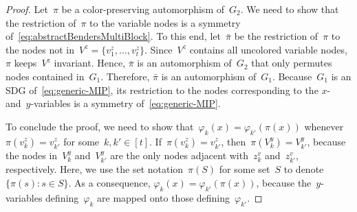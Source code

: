 \documentclass[a4paper,10pt]{article}
\theoremstyle{definition}
\begin{document}
\begin{proof}
  Let~$\pi$ be a color-preserving automorphism of~$G_2$.
  We need to show that the restriction of~$\pi$ to the variable nodes is a symmetry of~\eqref{eq:abstractBendersMultiBlock}.
  To this end, let~$\bar{\pi}$ be the restriction of~$\pi$ to the nodes not in~$V^z = \{v^z_1,\dots,v^z_t\}$.
  Since~$V^z$ contains all uncolored variable nodes, $\pi$ keeps~$V^z$ invariant.
  Hence, $\bar{\pi}$ is an automorphism of~$G_2$ that only permutes nodes contained in~$G_1$.
  Therefore, $\bar{\pi}$ is an automorphism of~$G_1$.
  Because~$G_1$ is an SDG of~\eqref{eq:generic-MIP}, its restriction to the nodes corresponding to the $x$- and~$y$-variables is a symmetry of~\eqref{eq:generic-MIP}.

  To conclude the proof, we need to show that~$\varphi_k(x) = \varphi_{k'}(\pi(x))$ whenever~$\pi(v^z_k) = v^z_{k'}$ for some~$k,k' \in [t]$.
  If~$\pi(v^z_k) = v^z_{k'}$, then~$\pi(V^y_k) = V^y_{k'}$, because the nodes in~$V^y_k$ and~$V^y_{k'}$ are the only nodes adjacent with~$z^v_k$ and~$z^v_{k'}$, respectively.
  Here, we use the set notation~$\pi(S)$ for some set~$S$ to denote~$\{\pi(s) : s \in S\}$.
  As a consequence, $\varphi_k(x) = \varphi_{k'}(\pi(x))$, because the~$y$-variables defining~$\varphi_k$ are mapped onto those defining~$\varphi_{k'}$.
\end{proof}
\end{document}
